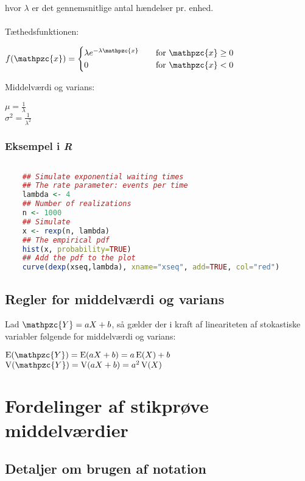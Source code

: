 \documentclass{article}
\newcommand{\mellemrum}{\vspace{2 ex}}
\newcommand{\cent}[1]{ \mellemrum \begin{center} #1\end{center} \mellemrum }
\newcommand{\op}[1]{\operatorname{#1}}
\newcommand{\stack}[1]{
	\begin{cases}
		#1
	\end{cases}}
\newcommand{\script}[1]{\mathpzc{#1}}
\begin{document}
	hvor $\lambda$ er det gennemsnitlige antal hændelser pr. enhed. \\\\
	
	Tæthedsfunktionen:
	
	\cent{$ f(\script{x}) = \stack{\lambda e^{-\lambda \script{x}} & \quad \text{for } \script{x} \geq 0 \\ 0 & \quad \text{for } \script{x} <0} $}
	
	Middelværdi og varians:
	
	\cent{$ \mu = \frac{1}{\lambda}$ \\
		 $\sigma^2 = \frac{1}{\lambda^2}$}
	
	\subsubsection*{Eksempel i \textit{R}}
	
	\begin{lstlisting}[language=R]
	
	## Simulate exponential waiting times
	## The rate parameter: events per time
	lambda <- 4
	## Number of realizations
	n <- 1000
	## Simulate
	x <- rexp(n, lambda)
	## The empirical pdf
	hist(x, probability=TRUE)
	## Add the pdf to the plot
	curve(dexp(xseq,lambda), xname="xseq", add=TRUE, col="red")\end{lstlisting}
	
	
	\subsection{Regler for middelværdi og varians}
	
	Lad $\script{Y} = aX +b $, så gælder der i kraft af lineariteten af stokastiske variabler følgende for middelværdi og varians:
	
	\cent{$ \op{E}(\script{Y}) = \op{E}(aX+b) = a\op{E}(X) + b $ \\
				$ \op{V}(\script{Y}) = \op{V}(aX + b) = a^2\op{V}(X) $}

	
	
	\section{Fordelinger af stikprøve middelværdier}
	\subsection{Detaljer om brugen af notation}
	
\end{document}
